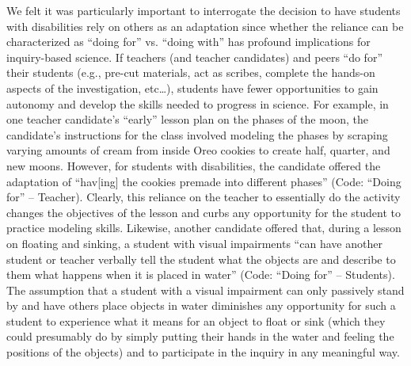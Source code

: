 \documentclass[11.5pt]{sig-alternate} %
\begin{document}
\begin{large}
We felt it was particularly important to interrogate the decision to have students with disabilities rely on others as an adaptation since whether the reliance can be characterized as  “doing for” vs. “doing with” has profound implications for inquiry-based science.  If teachers (and teacher candidates) and peers “do for” their students (e.g., pre-cut materials, act as scribes, complete the hands-on aspects of the investigation, etc…), students have fewer opportunities to gain autonomy and develop the skills needed to progress in science.  For example, in one teacher candidate’s “early” lesson plan on the phases of the moon, the candidate’s instructions for the class involved modeling the phases by scraping varying amounts of cream from inside Oreo cookies to create half, quarter, and new moons.  However, for students with disabilities, the candidate offered the adaptation of “hav[ing] the cookies premade into different phases” (Code: “Doing for” – Teacher).  Clearly, this reliance on the teacher to essentially do the activity changes the objectives of the lesson and curbs any opportunity for the student to practice modeling skills. Likewise, another candidate offered that, during a lesson on floating and sinking, a student with visual impairments “can have another student or teacher verbally tell the student what the objects are and describe to them what happens when it is placed in water” (Code: “Doing for” – Students). The assumption that a student with a visual impairment can only passively stand by and have others place objects in water diminishes any opportunity for such a student to experience what it means for an object to float or sink (which they could presumably do by simply putting their hands in the water and feeling the positions of the objects) and to participate in the inquiry in any meaningful way.


\end{large}
\end{document}

